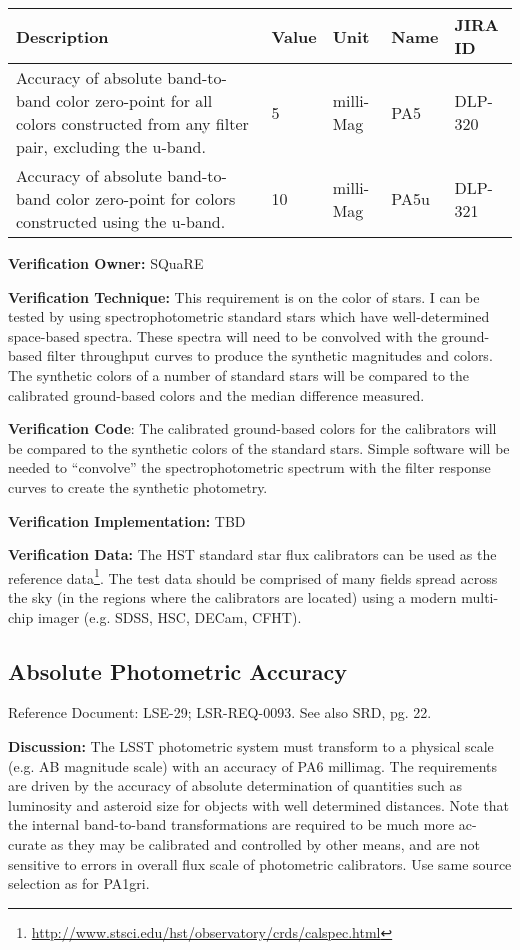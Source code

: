 \documentclass[DM,lsstdraft,toc]{lsstdoc}
\begin{document}
\begin{longtable}[]{@{}p{}llll@{}}
\toprule
Description & Value & Unit & Name & JIRA ID\tabularnewline
\midrule
\endhead
Accuracy of absolute band-to-band color zero-point for all colors
constructed from any filter pair, excluding the u-band. & 5 & milli-Mag
& PA5 & DLP-320\tabularnewline
Accuracy of absolute band-to-band color zero-point for colors
constructed using the u-band. & 10 & milli-Mag & PA5u &
DLP-321\tabularnewline
\bottomrule
\end{longtable}

\textbf{Verification Owner:} SQuaRE

\textbf{Verification Technique:} This requirement is on the color of
stars. I can be tested by using spectrophotometric standard stars which
have well-determined space-based spectra. These spectra will need to be
convolved with the ground-based filter throughput curves to produce the
synthetic magnitudes and colors. The synthetic colors of a number of
standard stars will be compared to the calibrated ground-based colors
and the median difference measured.

\textbf{Verification Code}: The calibrated ground-based colors for the
calibrators will be compared to the synthetic colors of the standard
stars. Simple software will be needed to ``convolve'' the
spectrophotometric spectrum with the filter response curves to create
the synthetic photometry.

\textbf{Verification Implementation:} TBD

\textbf{Verification Data:} The HST standard star flux calibrators can
be used as the reference data\footnote{\url{http://www.stsci.edu/hst/observatory/crds/calspec.html}}. The test data
should be comprised of many fields spread across the sky (in the regions
where the calibrators are located) using a modern multi-chip imager
(e.g. SDSS, HSC, DECam, CFHT).

\subsection{Absolute Photometric
Accuracy}\label{absolute-photometric-accuracy}

Reference Document: LSE-29; LSR-REQ-0093. See also SRD, pg. 22.

\textbf{Discussion:} The LSST photometric system must transform to a
physical scale (e.g. AB magnitude scale) with an accuracy of PA6
millimag. The requirements are driven by the accuracy of absolute
determination of quantities such as luminosity and asteroid size for
objects with well determined distances. Note that the internal
band-to-band transformations are required to be much more ac- curate as
they may be calibrated and controlled by other means, and are not
sensitive to errors in overall flux scale of photometric calibrators.
Use same source selection as for PA1gri.
\end{document}

